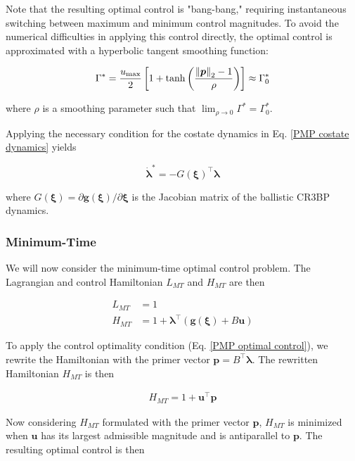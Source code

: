 \documentclass[letterpaper, preprint, paper,11pt]{AAS}	%
\begin{document}
Note that the resulting optimal control is "bang-bang," requiring instantaneous switching between maximum and minimum control magnitudes. To avoid the numerical difficulties in applying this control directly, the optimal control is approximated with a hyperbolic tangent smoothing function:  

\begin{equation}
    \Gamma^* = \frac{u_{\text{max}}}{2} \left[1 + \tanh \left(\frac{\norm{\bm{p}}_2 - 1}{\rho} \right)\right] \approx \Gamma_0^* \label{hyperbolic tangent smoothing}
\end{equation}

\noindent where $\rho$ is a smoothing parameter such that $\lim_{\rho \rightarrow 0} \Gamma^* = \Gamma_0^*$.

Applying the necessary condition for the costate dynamics in Eq. \ref{PMP costate dynamics} yields

\begin{equation}
    \dot{\bm{\lambda}}^* = -G(\bm{\xi})^\top \bm{\lambda} \label{eq:min-fuel costate dynamics}
\end{equation}

\noindent where $G(\bm{\xi}) = \partial \bm{g}(\bm{\xi})/\partial \bm{\xi}$ is the Jacobian matrix of the ballistic CR3BP dynamics.

\subsubsection{Minimum-Time}

We will now consider the minimum-time optimal control problem. The Lagrangian and control Hamiltonian $L_{MT}$ and $H_{MT}$ are then

\begin{align}
    L_{MT} &= 1 \\
    H_{MT} &= 1 + \bm{\lambda}^\top (\bm{g}(\bm{\xi}) + B\bm{u})
\end{align}

To apply the control optimality condition (Eq. \ref{PMP optimal control}), we rewrite the Hamiltonian with the primer vector $\bm{p} = B^\top \bm{\lambda}$. The rewritten Hamiltonian $H_{MT}$ is then

\begin{align}
    H_{MT} = 1 + \bm{u}^\top \bm{p}
\end{align}

Now considering $H_{MT}$ formulated with the primer vector $\bm{p}$, $H_{MT}$ is minimized when $\bm{u}$ has its largest admissible magnitude and is antiparallel to $\bm{p}$. The resulting optimal control is then
\end{document}
